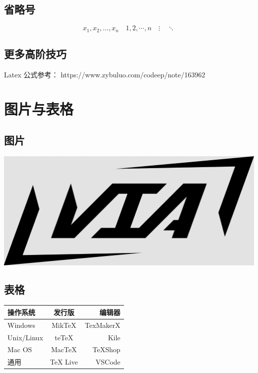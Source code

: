 \documentclass[UTF8]{ctexart}
\begin{document}
\subsection{省略号}

\[ x_1,x_2,\dots ,x_n\quad 1,2,\cdots ,n\quad
    \vdots\quad \ddots \]

\subsection{更多高阶技巧}

Latex 公式参考： https://www.zybuluo.com/codeep/note/163962

\section{图片与表格}

\subsection{图片}

\includegraphics[width = .9\textwidth]{assets/pic/Lviat Logo.png}

\subsection{表格}

\begin{tabular}{|l|c|r|}
    \hline
    操作系统   & 发行版   & 编辑器    \\
    \hline
    Windows    & MikTeX   & TexMakerX \\
    \hline
    Unix/Linux & teTeX    & Kile      \\
    \hline
    Mac OS     & MacTeX   & TeXShop   \\
    \hline
    通用       & TeX Live & VSCode    \\
    \hline
\end{tabular}
\end{document}
